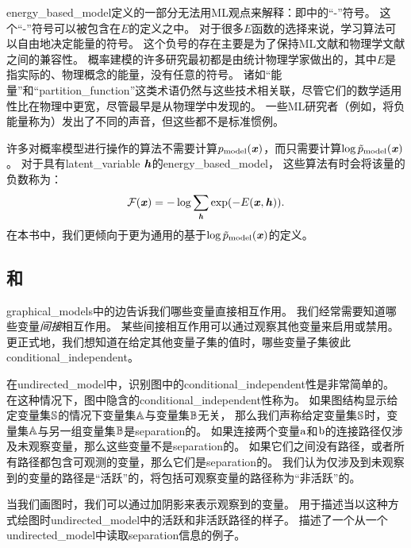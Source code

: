 \gls{energy_based_model}定义的一部分无法用\gls{ML}观点来解释：即中的``-''符号。
这个``-''符号可以被包含在$E$的定义之中。
对于很多$E$函数的选择来说，学习算法可以自由地决定能量的符号。
这个负号的存在主要是为了保持\gls{ML}文献和物理学文献之间的兼容性。
概率建模的许多研究最初都是由统计物理学家做出的，其中$E$是指实际的、物理概念的能量，没有任意的符号。
诸如``能量''和``\gls{partition_function}''这类术语仍然与这些技术相关联，尽管它们的数学适用性比在物理中更宽，尽管最早是从物理学中发现的。
一些\gls{ML}研究者（例如，\citet{Smolensky86}将负能量称为）发出了不同的声音，但这些都不是标准惯例。


许多对概率模型进行操作的算法不需要计算$p_{\text{model}}(\boldsymbol{\mathit{x}})$，而只需要计算$\log \tilde{p}_{\text{model}}(\boldsymbol{\mathit{x}})$。
对于具有\gls{latent_variable} $\boldsymbol{\mathit{h}}$的\gls{energy_based_model}， 这些算法有时会将该量的负数称为：
\begin{align}
\label{eqn:168}
\mathcal{F} (\boldsymbol{\mathit{x}}) = -\log \sum_{\boldsymbol{\mathit{h}}} \exp(-E(\boldsymbol{\mathit{x}},\boldsymbol{\mathit{h}})).
\end{align}
在本书中，我们更倾向于更为通用的基于$\log \tilde{p}_{\text{model}}(\boldsymbol{\mathit{x}})$的定义。


\subsection{和}
\label{sec:separation_and_d_separation}

\gls{graphical_models}中的边告诉我们哪些变量直接相互作用。
我们经常需要知道哪些变量\emph{间接}相互作用。 
某些间接相互作用可以通过观察其他变量来启用或禁用。
更正式地，我们想知道在给定其他变量子集的值时，哪些变量子集彼此\gls{conditional_independent}。


在\gls{undirected_model}中，识别图中的\gls{conditional_independent}性是非常简单的。 
在这种情况下，图中隐含的\gls{conditional_independent}性称为。
如果图结构显示给定变量集$\mathbb{S}$的情况下变量集$\mathbb{A}$与变量集$\mathbb{B}$无关，
那么我们声称给定变量集$\mathbb{S}$时，变量集$\mathbb{A}$与另一组变量集$\mathbb{B}$是\gls{separation}的。
如果连接两个变量$\mathrm{a}$和$\mathrm{b}$的连接路径仅涉及未观察变量，那么这些变量不是\gls{separation}的。
如果它们之间没有路径，或者所有路径都包含可观测的变量，那么它们是\gls{separation}的。
我们认为仅涉及到未观察到的变量的路径是``活跃''的，将包括可观察变量的路径称为``非活跃''的。


当我们画图时，我们可以通过加阴影来表示观察到的变量。
用于描述当以这种方式绘图时\gls{undirected_model}中的活跃和非活跃路径的样子。
描述了一个从一个\gls{undirected_model}中读取\gls{separation}信息的例子。



